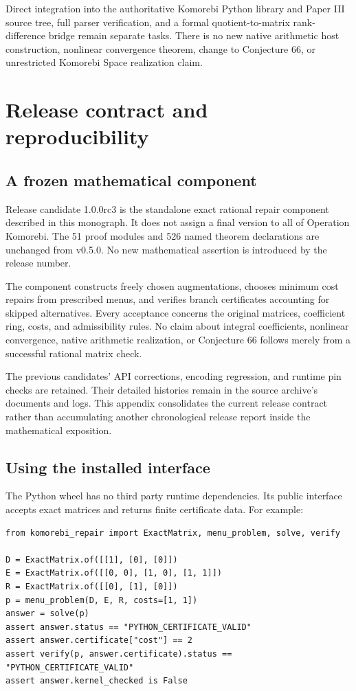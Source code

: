\documentclass[11pt,letterpaper,oneside,openany]{book}
\theoremstyle{quiet}
\begin{document}
Direct integration into the authoritative Komorebi Python library and Paper III source tree, full parser verification, and a formal quotient-to-matrix rank-difference bridge remain separate tasks. There is no new native arithmetic host construction, nonlinear convergence theorem, change to Conjecture 66, or unrestricted Komorebi Space realization claim.

\chapter{Release contract and reproducibility}
\label{app:release-candidate}
\label{app:rc2-portability}

\section{A frozen mathematical component}

Release candidate 1.0.0rc3 is the standalone exact rational repair component described in this monograph. It does not assign a final version to all of Operation Komorebi. The 51 proof modules and 526 named theorem declarations are unchanged from v0.5.0. No new mathematical assertion is introduced by the release number.

The component constructs freely chosen augmentations, chooses minimum cost repairs from prescribed menus, and verifies branch certificates accounting for skipped alternatives. Every acceptance concerns the original matrices, coefficient ring, costs, and admissibility rules. No claim about integral coefficients, nonlinear convergence, native arithmetic realization, or Conjecture 66 follows merely from a successful rational matrix check.

The previous candidates' API corrections, encoding regression, and runtime pin checks are retained. Their detailed histories remain in the source archive's documents and logs. This appendix consolidates the current release contract rather than accumulating another chronological release report inside the mathematical exposition.

\section{Using the installed interface}

The Python wheel has no third party runtime dependencies. Its public interface accepts exact matrices and returns finite certificate data. For example:

\begin{Verbatim}[fontsize=\small,breaklines=true]
from komorebi_repair import ExactMatrix, menu_problem, solve, verify

D = ExactMatrix.of([[1], [0], [0]])
E = ExactMatrix.of([[0, 0], [1, 0], [1, 1]])
R = ExactMatrix.of([[0], [1], [0]])
p = menu_problem(D, E, R, costs=[1, 1])
answer = solve(p)
assert answer.status == "PYTHON_CERTIFICATE_VALID"
assert answer.certificate["cost"] == 2
assert verify(p, answer.certificate).status == "PYTHON_CERTIFICATE_VALID"
assert answer.kernel_checked is False
\end{Verbatim}
\end{document}
